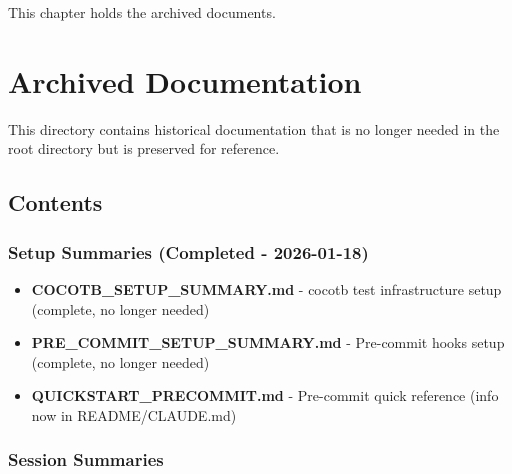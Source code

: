 This chapter holds the archived documents.

\section{Archived Documentation}\label{cr:app:archive-readme}

\begin{record}

This directory contains historical documentation that is no longer
needed in the root directory but is preserved for reference.

\end{record}

\subsection{Contents}\label{cr:app:archive-readme:contents}

\subsubsection{Setup Summaries (Completed - 2026-01-18)}\label{cr:app:archive-readme:setup-summaries-completed-2026-01-18}

\begin{record}

\begin{itemize}
\tightlist
\item
  \textbf{COCOTB\_\allowbreak{}SETUP\_\allowbreak{}SUMMARY.md} - cocotb
  test infrastructure setup (complete, no longer needed)
\item
  \textbf{PRE\_\allowbreak{}COMMIT\_\allowbreak{}SETUP\_\allowbreak{}SUMMARY.md}
  - Pre-commit hooks setup (complete, no longer needed)
\item
  \textbf{QUICKSTART\_\allowbreak{}PRECOMMIT.md} - Pre-commit quick
  reference (info now in README/\allowbreak{}CLAUDE.md)
\end{itemize}

\end{record}

\subsubsection{Session Summaries}\label{cr:app:archive-readme:session-summaries}

